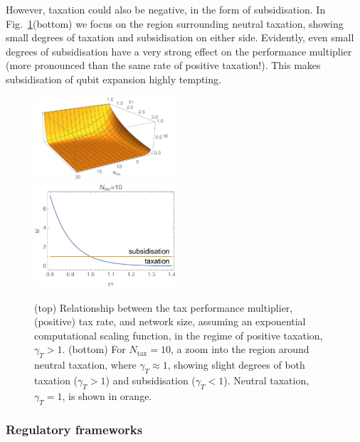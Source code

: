 However, taxation could also be negative, in the form of subsidisation. In Fig.~\ref{fig:tax_exp}(bottom) we focus on the region surrounding neutral taxation, showing small degrees of taxation and subsidisation on either side. Evidently, even small degrees of subsidisation have a very strong effect on the performance multiplier (more pronounced than the same rate of positive taxation!). This makes subsidisation of qubit expansion highly tempting.

\begin{figure}[!htb]
\includegraphics[width=0.47\textwidth]{tax_exp} \\
\includegraphics[width=0.47\textwidth]{tax_subsidy}
\caption{(top) Relationship between the tax performance multiplier, (positive) tax rate, and network size, assuming an exponential computational scaling function, in the regime of positive taxation, \mbox{$\gamma_T>1$}. (bottom) For \mbox{$N_\text{tax}=10$}, a zoom into the region around neutral taxation, where \mbox{$\gamma_T\approx 1$}, showing slight degrees of both taxation (\mbox{$\gamma_T>1$}) and subsidisation (\mbox{$\gamma_T<1$}). Neutral taxation, \mbox{$\gamma_T=1$}, is shown in orange.}\label{fig:tax_exp}	
\end{figure}

%
%

\subsubsection{Regulatory frameworks} 


